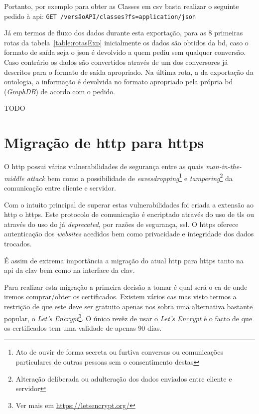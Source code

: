 Portanto, por exemplo para obter as Classes em \acrshort{csv} basta realizar o seguinte pedido à \acrshort{api}: \verb|GET /versãoAPI/classes?fs=application/json|

Já em termos de fluxo dos dados durante esta exportação, para as 8 primeiras rotas da tabela~\ref{table:rotasExp} inicialmente os dados são obtidos da \acrshort{bd}, caso o formato de saída seja o \acrshort{json} é devolvido a quem pediu sem qualquer conversão. Caso contrário os dados são convertidos através de um dos conversores já descritos para o formato de saída apropriado. Na última rota, a da exportação da ontologia, a informação é devolvida no formato apropriado pela própria \acrshort{bd} (\textit{GraphDB}) de acordo com o pedido.

TODO

\section{Migração de \acrshort{http} para \acrshort{https}}

O \acrfull{http} possui várias vulnerabilidades de segurança entre as quais \textit{man-in-the-middle attack} bem como a possibilidade de \textit{eavesdropping}\footnote{Ato de ouvir de forma secreta ou furtiva conversas ou comunicações particulares de outras pessoas sem o consentimento destas} e \textit{tampering}\footnote{Alteração deliberada ou adulteração dos dados enviados entre cliente e servidor} da comunicação entre cliente e servidor.

Com o intuito principal de superar estas vulnerabilidades foi criada a extensão ao \acrshort{http} o \acrfull{https}. Este protocolo de comunicação é encriptado através do uso de \acrfull{tls} ou através do uso do já \textit{deprecated}, por razões de segurança, \acrfull{ssl}. O \acrshort{https} oferece autenticação dos \textit{websites} acedidos bem como privacidade e integridade dos dados trocados.  

É assim de extrema importância a migração do atual \acrshort{http} para \acrshort{https} tanto na \acrshort{api} da \acrshort{clav} bem como na interface da \acrshort{clav}.

Para realizar esta migração a primeira decisão a tomar é qual será o \acrfull{ca} de onde iremos comprar/obter os certificados. Existem vários \acrshort{ca}s mas visto termos a restrição de que este deve ser gratuito apenas nos sobra uma alternativa bastante popular, o \textit{Let's Encrypt}\footnote{Ver mais em \url{https://letsencrypt.org/}}. O único revêz de usar o \textit{Let's Encrypt} é o facto de que os certificados tem uma validade de apenas 90 dias.

